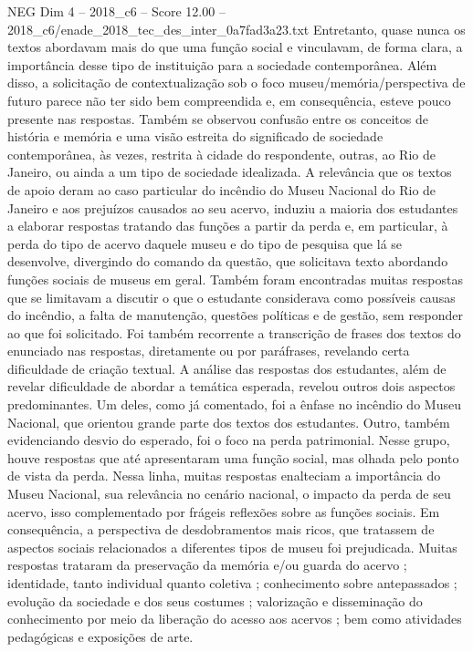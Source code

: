 \begin{textsample}{NEG Dim 4 – 2018\_c6 – Score 12.00 – 2018\_c6/enade\_2018\_tec\_des\_inter\_0a7fad3a23.txt}
Entretanto, quase nunca os textos abordavam mais do que uma função social e vinculavam, de forma clara, a importância desse tipo de instituição para a sociedade contemporânea.
Além disso, a solicitação de contextualização sob o foco museu/memória/perspectiva de futuro parece não ter sido bem compreendida e, em consequência, esteve pouco presente nas respostas.
Também se observou confusão entre os conceitos de história e memória e uma visão estreita do significado de sociedade contemporânea, às vezes, restrita à cidade do respondente, outras, ao Rio de Janeiro, ou ainda a um tipo de sociedade idealizada.
A relevância que os textos de apoio deram ao caso particular do incêndio do Museu Nacional do Rio de Janeiro e aos prejuízos causados ao seu acervo, induziu a maioria dos estudantes a elaborar respostas tratando das funções a partir da perda e, em particular, à perda do tipo de acervo daquele museu e do tipo de pesquisa que lá se desenvolve, divergindo do comando da questão, que solicitava texto abordando funções sociais de museus em geral.
Também foram encontradas muitas respostas que se limitavam a discutir o que o estudante considerava como possíveis causas do incêndio, a falta de manutenção, questões políticas e de gestão, sem responder ao que foi solicitado.
Foi também recorrente a transcrição de frases dos textos do enunciado nas respostas, diretamente ou por paráfrases, revelando certa dificuldade de criação textual.
A análise das respostas dos estudantes, além de revelar dificuldade de abordar a temática esperada, revelou outros dois aspectos predominantes.
Um deles, como já comentado, foi a ênfase no incêndio do Museu Nacional, que orientou grande parte dos textos dos estudantes.
Outro, também evidenciando desvio do esperado, foi o foco na perda patrimonial.
Nesse grupo, houve respostas que até apresentaram uma função social, mas olhada pelo ponto de vista da perda.
Nessa linha, muitas respostas enalteciam a importância do Museu Nacional, sua relevância no cenário nacional, o impacto da perda de seu acervo, isso complementado por frágeis reflexões sobre as funções sociais.
Em consequência, a perspectiva de desdobramentos mais ricos, que tratassem de aspectos sociais relacionados a diferentes tipos de museu foi prejudicada.
Muitas respostas trataram da preservação da memória e/ou guarda do acervo ; identidade, tanto individual quanto coletiva ; conhecimento sobre antepassados ; evolução da sociedade e dos seus costumes ; valorização e disseminação do conhecimento por meio da liberação do acesso aos acervos ; bem como atividades pedagógicas e exposições de arte.

\end{textsample}
